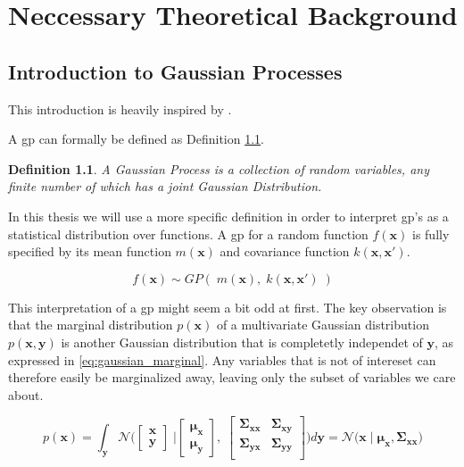 \chapter{Neccessary Theoretical Background}\label{chap:theory}

\section{Introduction to Gaussian Processes}

This introduction is heavily inspired by \cite{rasmussen}.

A \acrfull{gp} can formally be defined as Definition \ref{def:gp}.

\newtheorem{gp_def}{Definition}
\begin{gp_def}\label{def:gp}
A Gaussian Process is a collection of random variables, any finite number of which has a joint Gaussian Distribution.
\end{gp_def}

In this thesis we will use a more specific definition in order to interpret \acrshort{gp}'s as a statistical distribution over functions. A \acrshort{gp} for a random function $f(\boldsymbol{x})$ is fully specified by its mean function $m(\boldsymbol{x})$ and covariance function $k(\boldsymbol{x}, \boldsymbol{x}')$.

\begin{equation}\label{eq:gp}
    f(\boldsymbol{x}) \sim GP(\;m(\boldsymbol{x}), \; k(\boldsymbol{x}, \boldsymbol{x}')\;)
\end{equation}

This interpretation of a \acrshort{gp} might seem a bit odd at first. The key observation is that the marginal distribution $p(\boldsymbol{x})$ of a multivariate Gaussian distribution $p(\boldsymbol{x}, \boldsymbol{y})$ is another Gaussian distribution that is completetly independet of $\boldsymbol{y}$, as expressed in \cref{eq:gaussian_marginal}. Any variables that is not of intereset can therefore easily be marginalized away, leaving only the subset of variables we care about.

\begin{equation}\label{eq:gaussian_marginal}
    p(\boldsymbol{x}) = \int_{\boldsymbol{y}} \mathcal{N} \bigg(\begin{bmatrix}
        \boldsymbol{x} \\ \boldsymbol{y}
    \end{bmatrix}\; \bigg| \begin{bmatrix}
        \boldsymbol{\mu_x} \\ \boldsymbol{\mu_y}
    \end{bmatrix}, \; \begin{bmatrix}
        \boldsymbol{\Sigma_{xx}} & \boldsymbol{\Sigma_{xy}} \\
        \boldsymbol{\Sigma_{yx}} & \boldsymbol{\Sigma_{yy}} \\
    \end{bmatrix} \bigg) d\boldsymbol{y} = \mathcal{N} \big( \boldsymbol{x} \;\big| \; \boldsymbol{\mu_x}, \boldsymbol{\Sigma_{xx}}\big)
\end{equation}


